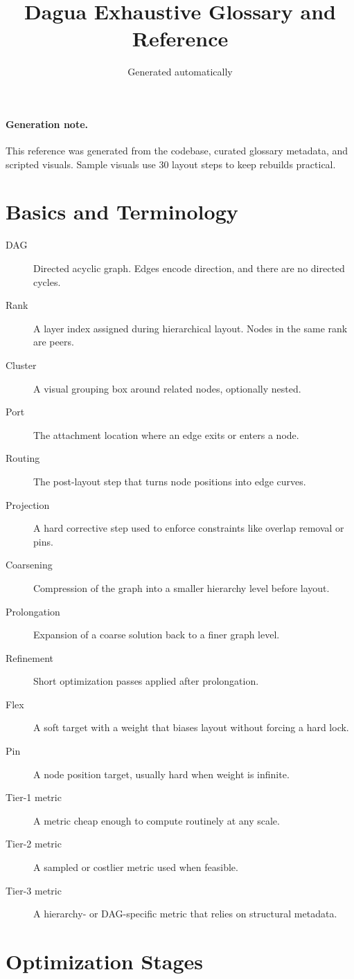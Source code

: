 \documentclass[11pt]{article}
\title{Dagua Exhaustive Glossary and Reference}
\date{Generated automatically}
\begin{document}
\maketitle
\tableofcontents
\paragraph{Generation note.} This reference was generated from the codebase,
curated glossary metadata, and scripted visuals. Sample visuals use
30 layout steps to keep rebuilds practical.
\section{Basics and Terminology}
\begin{description}\item[DAG] Directed acyclic graph. Edges encode direction, and there are no directed cycles.\item[Rank] A layer index assigned during hierarchical layout. Nodes in the same rank are peers.\item[Cluster] A visual grouping box around related nodes, optionally nested.\item[Port] The attachment location where an edge exits or enters a node.\item[Routing] The post-layout step that turns node positions into edge curves.\item[Projection] A hard corrective step used to enforce constraints like overlap removal or pins.\item[Coarsening] Compression of the graph into a smaller hierarchy level before layout.\item[Prolongation] Expansion of a coarse solution back to a finer graph level.\item[Refinement] Short optimization passes applied after prolongation.\item[Flex] A soft target with a weight that biases layout without forcing a hard lock.\item[Pin] A node position target, usually hard when weight is infinite.\item[Tier-1 metric] A metric cheap enough to compute routinely at any scale.\item[Tier-2 metric] A sampled or costlier metric used when feasible.\item[Tier-3 metric] A hierarchy- or DAG-specific metric that relies on structural metadata.\end{description}\section{Optimization Stages}
\end{document}
